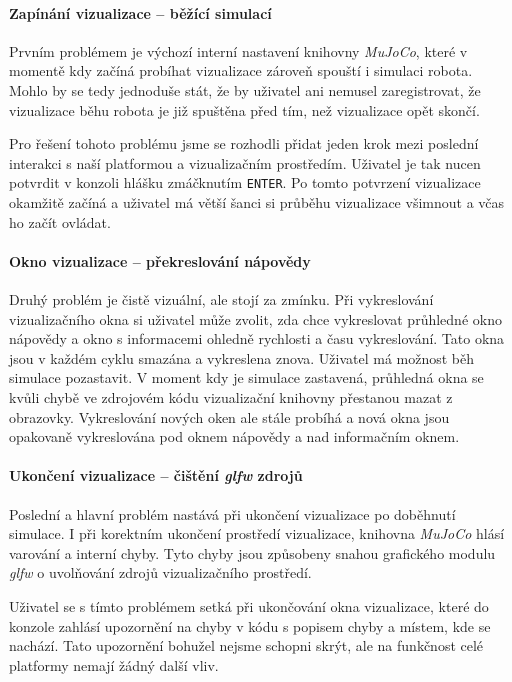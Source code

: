 \paragraph{Zapínání vizualizace -- běžící simulací}
Prvním problémem je výchozí interní nastavení knihovny \emph{MuJoCo}, které
v momentě kdy začíná probíhat vizualizace zároveň spouští i simulaci robota.
Mohlo by se tedy jednoduše stát, že by uživatel ani nemusel zaregistrovat, že
vizualizace běhu robota je již spuštěna před tím, než vizualizace opět skončí.

Pro řešení tohoto problému jsme se rozhodli přidat jeden krok mezi poslední
interakci s naší platformou a vizualizačním prostředím. Uživatel je tak nucen
potvrdit v konzoli hlášku zmáčknutím \texttt{ENTER}. Po tomto potvrzení
vizualizace okamžitě začíná a uživatel má větší šanci si průběhu vizualizace
všimnout a včas ho začít ovládat.

\paragraph{Okno vizualizace -- překreslování nápovědy}
Druhý problém je čistě vizuální, ale stojí za zmínku. Při vykreslování
vizualizačního okna si uživatel může zvolit, zda chce vykreslovat průhledné
okno nápovědy a okno s informacemi ohledně rychlosti a času vykreslování. Tato
okna jsou v každém cyklu smazána a vykreslena znova. Uživatel má možnost běh
simulace pozastavit. V moment kdy je simulace zastavená, průhledná okna se
kvůli chybě ve zdrojovém kódu vizualizační knihovny přestanou mazat z
obrazovky. Vykreslování nových oken ale stále probíhá a nová okna jsou
opakovaně vykreslována pod oknem nápovědy a nad informačním oknem.

\paragraph{Ukončení vizualizace -- čištění \emph{glfw} zdrojů}
Poslední a hlavní problém nastává při ukončení vizualizace po doběhnutí
simulace. I při korektním ukončení prostředí vizualizace, knihovna
\emph{MuJoCo} hlásí varování a interní chyby. Tyto chyby jsou způsobeny snahou
grafického modulu \emph{glfw} o uvolňování zdrojů vizualizačního prostředí.

Uživatel se s tímto problémem setká při ukončování okna vizualizace, které do
konzole zahlásí upozornění na chyby v kódu s popisem chyby a místem, kde se
nachází. Tato upozornění bohužel nejsme schopni skrýt, ale na funkčnost celé
platformy nemají žádný další vliv.

